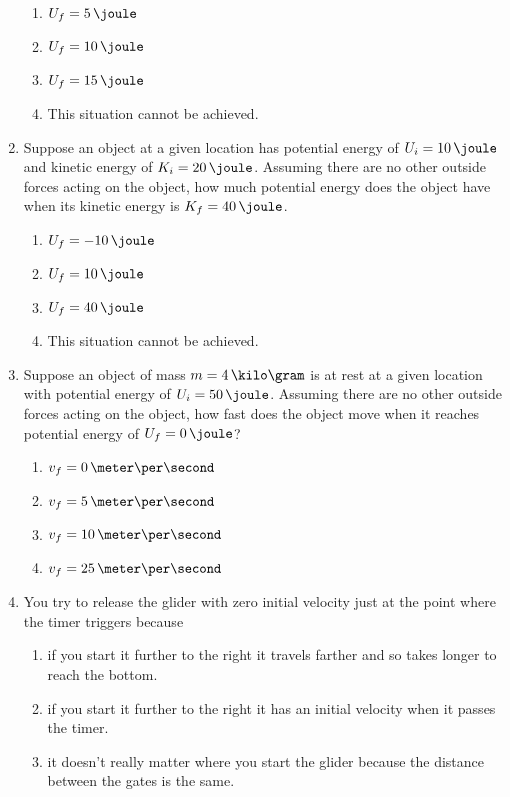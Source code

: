 \begin{enumerate}
  \begin{enumerate}
  \item $U_f =  5\,\joule$
  \item $U_f = 10\,\joule$
  \item $U_f = 15\,\joule$
  \item This situation cannot be achieved.
  \end{enumerate}
\item Suppose an object at a given location has potential energy of $U_i = 10\,\joule$ and kinetic energy of $K_i = 20\,\joule$. Assuming there are no other outside forces acting on the object, how much potential energy does the object have when its kinetic energy is $K_f = 40\,\joule$.
  \begin{enumerate}
  \item $U_f = -10\,\joule$
  \item $U_f =  10\,\joule$
  \item $U_f =  40\,\joule$
  \item This situation cannot be achieved.
  \end{enumerate}
\item Suppose an object of mass $m = 4\,\kilo\gram$ is at rest at a given location with potential energy of $U_i = 50\,\joule$. Assuming there are no other outside forces acting on the object, how fast does the object move when it reaches potential energy of $U_f = 0\,\joule$?
  \begin{enumerate}
  \item $v_f =  0\,\meter\per\second$
  \item $v_f =  5\,\meter\per\second$
  \item $v_f = 10\,\meter\per\second$
  \item $v_f = 25\,\meter\per\second$
  \end{enumerate}
\item You try to release the glider with zero initial velocity just at the point where the timer triggers because
  \begin{enumerate}
  \item if you start it further to the right it travels farther and so takes longer to reach the bottom.
  \item if you start it further to the right it has an initial velocity when it passes the timer.
  \item it doesn't really matter where you start the glider because the distance between the gates is the same.
  \end{enumerate}
\end{enumerate}






